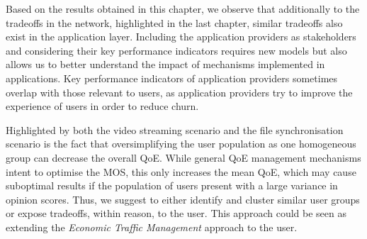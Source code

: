 Based on the results obtained in this chapter, we observe that additionally to the tradeoffs in the network, highlighted in the last chapter, similar tradeoffs also exist in the application layer.
Including the application providers as stakeholders and considering their key performance indicators requires new models but also allows us to better understand the impact of mechanisms implemented in applications.
Key performance indicators of application providers sometimes overlap with those relevant to users, as application providers try to improve the experience of users in order to reduce churn.

Highlighted by both the video streaming scenario and the file synchronisation scenario is the fact that oversimplifying the user population as one homogeneous group can decrease the overall \gls{QoE}.
While general \gls{QoE} management mechanisms intent to optimise the \gls{MOS}, this only increases the mean \gls{QoE}, which may cause suboptimal results if the population of users present with a large variance in opinion scores.
Thus, we suggest to either identify and cluster similar user groups or expose tradeoffs, within reason, to the user.
This approach could be seen as extending the \emph{Economic Traffic Management} approach to the user.